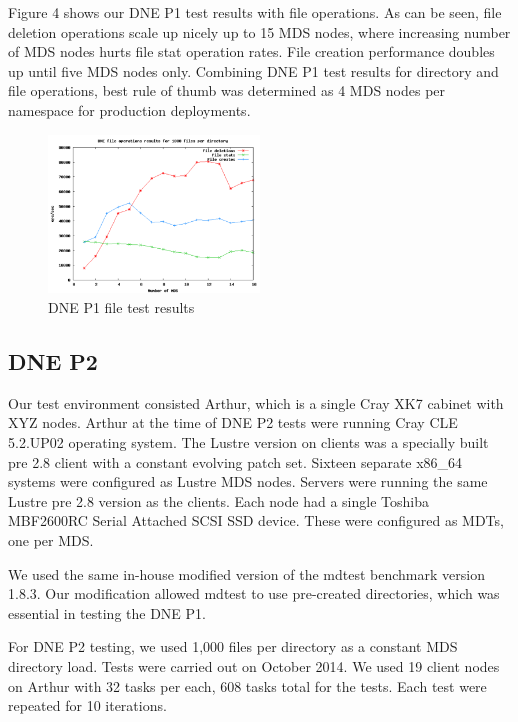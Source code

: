 \documentclass[conference,compsoc]{IEEEtran}
\begin{document}
Figure 4 shows our DNE P1 test results with file operations. As can be seen,
file deletion operations scale up nicely up to 15 MDS nodes, where increasing
number of MDS nodes hurts file stat operation rates. File creation performance
doubles up until five MDS nodes only.  Combining DNE P1 test results for
directory and file operations, best rule of thumb was determined as 4 MDS nodes
per namespace for production deployments.


\begin{figure}[!ht]
  \centering
    \includegraphics[width=0.5\textwidth]{figs/dnep1_file_results}
  \caption{DNE P1 file test results}
\end{figure}
 


\subsection{DNE P2}

Our test environment consisted Arthur, which is a single Cray XK7 cabinet with
XYZ nodes. Arthur at the time of DNE P2 tests were running Cray CLE 5.2.UP02
operating system. The Lustre version on clients was a specially built pre 2.8
client with a constant evolving patch set. Sixteen separate x86\_64 systems were
configured as Lustre MDS nodes. Servers were running the same Lustre pre 2.8
version as the clients. Each node had a single Toshiba MBF2600RC Serial
Attached SCSI SSD device. These were configured as MDTs, one per MDS. 

We used the same in-house modified version of the mdtest benchmark version
1.8.3. Our modification allowed mdtest to use pre-created directories, which was
essential in testing the DNE P1. 


For DNE P2 testing, we used 1,000 files per directory as a constant MDS
directory load. Tests were carried out on October 2014. We used 19 client nodes
on Arthur with 32 tasks per each, 608 tasks total for the tests. Each test were
repeated for 10 iterations.
\end{document}
